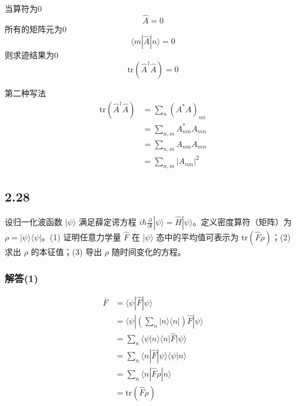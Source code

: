 当算符为0
\begin{equation}
    \hat{A}=0
\end{equation}
所有的矩阵元为0
\begin{equation}
    \langle m|\hat{A}|n\rangle =0
\end{equation}
则求迹结果为0
\begin{equation}
    \mathrm{tr}\left( \hat{A}^{\dagger}\hat{A} \right) =0
\end{equation}


第二种写法
\begin{equation}
    \begin{aligned}
        \mathrm{tr}\left( \hat{A}^{\dagger}\hat{A} \right) &=\sum_n{\left( A^*A \right) _{nn}}
\\
&=\sum_{n,m}{A_{nm}^{*}A_{mn}}
\\
&=\sum_{n,m}{A_{nm}A_{mn}}
\\
&=\sum_{n,m}{\left| A_{nm} \right|^2}
    \end{aligned}
\end{equation}



\newpage
\subsection{2.28}
设归一化波函数 $|\psi\rangle$ 满足薛定谔方程 $i \hbar \frac{\partial}{\partial t} |\psi\rangle = \hat{H} |\psi\rangle$。定义密度算符（矩阵）为 $\rho = |\psi\rangle \langle \psi|$。(1) 证明任意力学量 $\hat{F}$ 在 $|\psi\rangle$ 态中的平均值可表示为 tr$(\hat{F}\rho)$；(2) 求出 $\rho$ 的本征值；(3) 导出 $\rho$ 随时间变化的方程。

\subsubsection{解答(1)}
\begin{equation}
    \begin{aligned}
        \bar{F}&=\langle \psi |\hat{F}|\psi \rangle 
\\
&=\langle \psi |\left( \sum_n{|n\rangle \langle n|} \right) \hat{F}|\psi \rangle 
\\
&=\sum_n{\langle \psi |n\rangle \langle n|\hat{F}|\psi \rangle}
\\
&=\sum_n{\langle n|\hat{F}|\psi \rangle \langle \psi |n\rangle}
\\
&=\sum_n{\langle n|\hat{F}\rho |n\rangle}
\\
&=\mathrm{tr}\left( \hat{F}\rho \right) 
    \end{aligned}
\end{equation}


